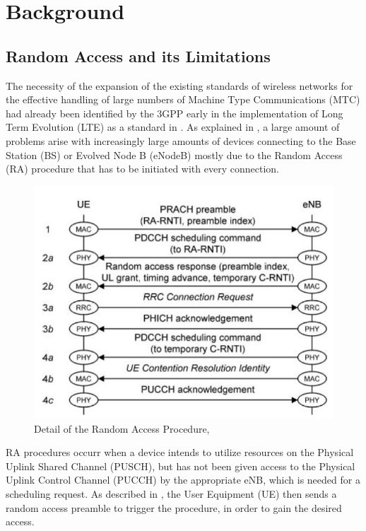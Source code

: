 \chapter{Background}

\section{Random Access and its Limitations}\label{B:RA}
The necessity of the expansion of the existing standards of wireless networks for the effective handling of large numbers of Machine Type Communications (MTC) had already been identified by the 3GPP early in the implementation of Long Term Evolution (LTE) as a standard in \cite{3rdGenerationPartnershipProject;2011}. As explained in \cite{Laya2014}, a large amount of problems arise with increasingly large amounts of devices connecting to the Base Station (BS) or Evolved Node B (eNodeB) mostly due to the Random Access (RA) procedure that has to be initiated with every connection.

\begin{figure}[!h]
\centering
\includegraphics[scale = 0.45]{figures/Random_Access_Procedure}
\caption{Detail of the Random Access Procedure, \cite{Cox2012}}
\end{figure}

RA procedures occurr when a device intends to utilize resources on the Physical Uplink Shared Channel (PUSCH), but has not been given access to the Physical Uplink Control Channel (PUCCH) by the appropriate eNB, which is needed for a scheduling request. As described in \cite{Cox2012}, the User Equipment (UE) then sends a random access preamble to trigger the procedure, in order to gain the desired access.

